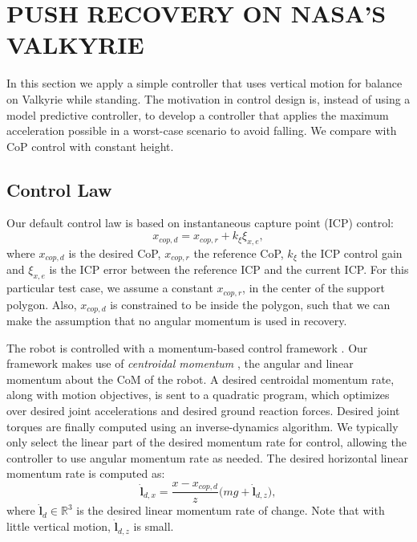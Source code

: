 \documentclass[letterpaper, 10 pt, conference]{ieeeconf}  %
\newcommand{\rcmpd}{x_{cop,d}}
\newcommand{\rcmpr}{x_{cop,r}}
\newcommand{\icpe}{\xi_{x,e}}
\begin{document}
\section{PUSH RECOVERY ON NASA'S VALKYRIE}\label{sec:valkyrie}
In this section we apply a simple controller that uses vertical motion for balance on Valkyrie while standing. The motivation in control design is, instead of using a model predictive controller, to develop a controller that applies the maximum acceleration possible in a worst-case scenario to avoid falling. We compare with CoP control with constant height.
\subsection{Control Law}
Our default control law is based on instantaneous capture point (ICP) \cite{koolen2012capturability} control:
\begin{equation}
	\rcmpd = \rcmpr + k_{\xi}\icpe,
\end{equation}
where $\rcmpd$ is the desired CoP, $\rcmpr$ the reference CoP, $k_{\xi}$ the ICP control gain and $\icpe$ is the ICP error between the reference ICP and the current ICP. For this particular test case, we assume a constant $\rcmpr$, in the center of the support polygon. Also, $\rcmpd$ is constrained to be inside the polygon, such that we can make the assumption that no angular momentum is used in recovery.

The robot is controlled with a momentum-based control framework \cite{koolen2016design}. Our framework makes use of \textit{centroidal momentum} \cite{orin2013centroidal}, the angular and linear momentum about the CoM of the robot. 
A desired centroidal momentum rate, along with motion objectives, is sent to a quadratic program, which optimizes over desired joint accelerations and desired ground reaction forces. Desired joint torques are finally computed using an inverse-dynamics algorithm. We typically only select the linear part of the desired momentum rate for control, allowing the controller to use angular momentum rate as needed. The desired horizontal linear momentum rate is computed as:
\begin{equation}
	\dot{\mathbf{l}}_{d,x} = \frac{x-\rcmpd}{z}\big(mg + \dot{\mathbf{l}}_{d,z}\big),
\end{equation}
where $\dot{\mathbf{l}}_{d} \in \mathbb{R}^3$ is the desired linear momentum rate of change. Note that with little vertical motion, $ \dot{\mathbf{l}}_{d,z}$ is small.
\end{document}
